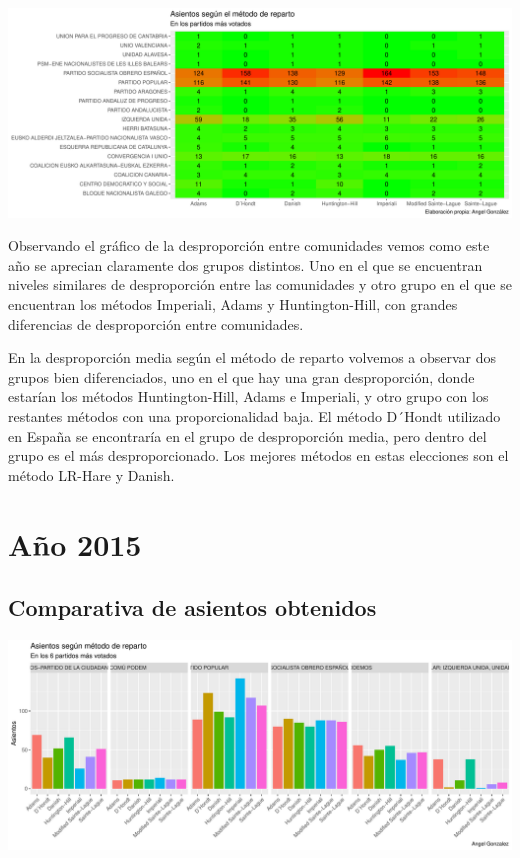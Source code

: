 \documentclass[12pt,a4paper,]{book}
\numberwithin{dummy}{section}
\theoremstyle{ocrenumbox}
\theoremstyle{blacknumex}
\theoremstyle{blacknumbox}
\theoremstyle{ocrenum}
\theoremstyle{ocrenum}
\begin{document}
\begin{center}\includegraphics[width=1\linewidth]{figurasR/unnamed-chunk-107-2} \end{center}

Observando el gráfico de la desproporción entre comunidades vemos como
este año se aprecian claramente dos grupos distintos. Uno en el que se
encuentran niveles similares de desproporción entre las comunidades y
otro grupo en el que se encuentran los métodos Imperiali, Adams y
Huntington-Hill, con grandes diferencias de desproporción entre
comunidades.

En la desproporción media según el método de reparto volvemos a observar
dos grupos bien diferenciados, uno en el que hay una gran desproporción,
donde estarían los métodos Huntington-Hill, Adams e Imperiali, y otro
grupo con los restantes métodos con una proporcionalidad baja. El método
D´Hondt utilizado en España se encontraría en el grupo de desproporción
media, pero dentro del grupo es el más desproporcionado. Los mejores
métodos en estas elecciones son el método LR-Hare y Danish.

\hypertarget{auxf1o-2015}{%
\section{Año 2015}\label{auxf1o-2015}}

\hypertarget{comparativa-de-asientos-obtenidos-11}{%
\subsection{Comparativa de asientos
obtenidos}\label{comparativa-de-asientos-obtenidos-11}}

\begin{center}\includegraphics[width=1\linewidth]{figurasR/unnamed-chunk-109-1} \end{center}
\end{document}
